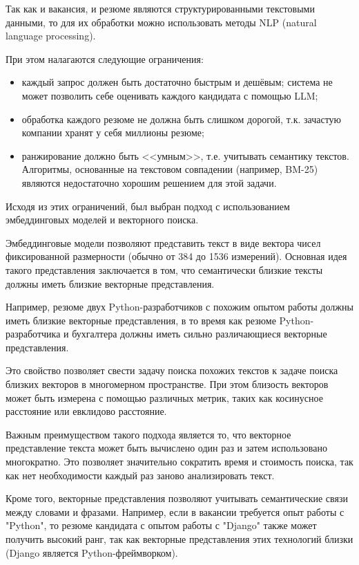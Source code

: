 \documentclass[14pt]{mmcs_article}
\begin{document}
Так как и вакансия, и резюме являются структурированными текстовыми данными, то для их обработки можно использовать методы NLP (natural language processing).

При этом налагаются следующие ограничения:

\begin{itemize}
  \item каждый запрос должен быть достаточно быстрым и дешёвым; система не может позволить себе оценивать каждого кандидата с помощью LLM;
  \item обработка каждого резюме не должна быть слишком дорогой, т.к. зачастую компании хранят у себя миллионы резюме;
  \item ранжирование должно быть <<умным>>, т.е. учитывать семантику текстов. Алгоритмы, основанные на текстовом совпадении (например, BM-25) являются недостаточно хорошим решением для этой задачи.
\end{itemize}

Исходя из этих ограничений, был выбран подход с использованием эмбеддинговых моделей и векторного поиска.

Эмбеддинговые модели позволяют представить текст в виде вектора чисел фиксированной размерности (обычно от 384 до 1536 измерений). Основная идея такого представления заключается в том, что семантически близкие тексты должны иметь близкие векторные представления.

Например, резюме двух Python-разработчиков с похожим опытом работы должны иметь близкие векторные представления, в то время как резюме Python-разработчика и бухгалтера должны иметь сильно различающиеся векторные представления.

Это свойство позволяет свести задачу поиска похожих текстов к задаче поиска близких векторов в многомерном пространстве. При этом близость векторов может быть измерена с помощью различных метрик, таких как косинусное расстояние или евклидово расстояние.

Важным преимуществом такого подхода является то, что векторное представление текста может быть вычислено один раз и затем использовано многократно. Это позволяет значительно сократить время и стоимость поиска, так как нет необходимости каждый раз заново анализировать текст.

Кроме того, векторные представления позволяют учитывать семантические связи между словами и фразами. Например, если в вакансии требуется опыт работы с "Python", то резюме кандидата с опытом работы с "Django" также может получить высокий ранг, так как векторные представления этих технологий близки (Django является Python-фреймворком).
\end{document}
